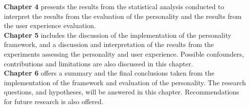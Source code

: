 \textbf{Chapter 4} presents the results from the statistical analysis conducted to interpret the results from the evaluation of the personality and the results from the user experience evaluation.\\

\textbf{Chapter 5} includes the discussion of the implementation of the personality framework, and a discussion and interpretation of the results from the experiments assessing the personality and user experience. Possible confounders, contributions and limitations are also discussed in this chapter.\\

\textbf{Chapter 6} offers a summary and the final conclusions taken from the implementation of the framework and evaluation of the personality. The research questions, and hypotheses, will be answered in this chapter. Recommendations for future research is also offered.\\